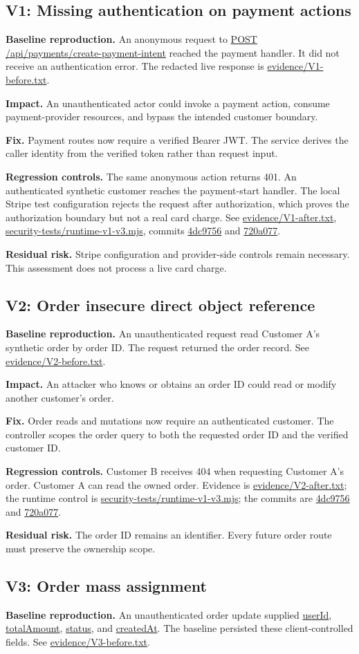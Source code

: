 \documentclass[11pt]{article}
\newcommand{\evidence}[1]{{\small\url{#1}}}
\newcommand{\finding}[1]{\subsection{#1}}
\newcommand{\baseline}{\textbf{Baseline reproduction.} }
\newcommand{\impact}{\textbf{Impact.} }
\newcommand{\fix}{\textbf{Fix.} }
\newcommand{\control}{\textbf{Regression controls.} }
\newcommand{\residual}{\textbf{Residual risk.} }
\begin{document}
\finding{V1: Missing authentication on payment actions}
\baseline An anonymous request to \evidence{POST /api/payments/create-payment-intent} reached the payment handler. It did not receive an authentication error. The redacted live response is \evidence{evidence/V1-before.txt}.

\impact An unauthenticated actor could invoke a payment action, consume payment-provider resources, and bypass the intended customer boundary.

\fix Payment routes now require a verified Bearer JWT. The service derives the caller identity from the verified token rather than request input.

\control The same anonymous action returns 401. An authenticated synthetic customer reaches the payment-start handler. The local Stripe test configuration rejects the request after authorization, which proves the authorization boundary but not a real card charge. See \evidence{evidence/V1-after.txt}, \evidence{security-tests/runtime-v1-v3.mjs}, commits \evidence{4dc9756} and \evidence{720a077}.

\residual Stripe configuration and provider-side controls remain necessary. This assessment does not process a live card charge.

\finding{V2: Order insecure direct object reference}
\baseline An unauthenticated request read Customer A's synthetic order by order ID. The request returned the order record. See \evidence{evidence/V2-before.txt}.

\impact An attacker who knows or obtains an order ID could read or modify another customer's order.

\fix Order reads and mutations now require an authenticated customer. The controller scopes the order query to both the requested order ID and the verified customer ID.

\control Customer B receives 404 when requesting Customer A's order. Customer A can read the owned order. Evidence is \evidence{evidence/V2-after.txt}; the runtime control is \evidence{security-tests/runtime-v1-v3.mjs}; the commits are \evidence{4dc9756} and \evidence{720a077}.

\residual The order ID remains an identifier. Every future order route must preserve the ownership scope.

\finding{V3: Order mass assignment}
\baseline An unauthenticated order update supplied \evidence{userId}, \evidence{totalAmount}, \evidence{status}, and \evidence{createdAt}. The baseline persisted these client-controlled fields. See \evidence{evidence/V3-before.txt}.
\end{document}
